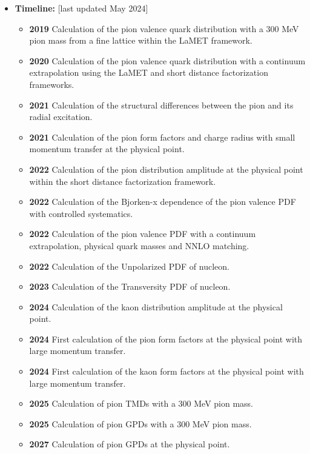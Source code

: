 \documentclass[12pt,hyperpdf]{article}
\begin{document}
\begin{itemize}
\item{\bf Timeline:} \hfill [last updated May 2024]
\begin{itemize}
    \item{\bf 2019} Calculation of the pion valence quark distribution with a 300 MeV pion mass from a fine lattice within the LaMET framework.~\cite{Izubuchi:2019lyk}
    \item{\bf 2020} Calculation of the pion valence quark distribution with a continuum extrapolation using the LaMET and short distance factorization frameworks.~\cite{Gao:2020ito}
    \item{\bf 2021} Calculation of the structural differences between the pion and its radial excitation.~\cite{Gao:2021hvs}
    \item{\bf 2021} Calculation of the pion form factors and charge radius with small momentum transfer at the physical point.~\cite{Gao:2021xsm}
    \item{\bf 2022} Calculation of the pion distribution amplitude at the physical point within the short distance factorization framework.~\cite{Gao:2022vyh}
    \item{\bf 2022} Calculation of the Bjorken-x dependence of the pion valence PDF with controlled systematics.~\cite{Gao:2021dbh}
    \item{\bf 2022} Calculation of the pion valence PDF with a continuum extrapolation, physical quark masses and NNLO matching.~\cite{Gao:2022iex}
    \item{\bf 2022} Calculation of the Unpolarized PDF of nucleon.~\cite{Gao:2022uhg}
    \item{\bf 2023} Calculation of the Transversity PDF of nucleon.~\cite{Gao:2023ktu}
    \item{\bf 2024} Calculation of the kaon distribution amplitude at the physical point.
    \item{\bf 2024} First calculation of the pion form factors at the physical point with large momentum transfer.
    \item{\bf 2024} First calculation of the kaon form factors at the physical point with large momentum transfer.
    \item{\bf 2025} Calculation of pion TMDs with a 300 MeV pion mass.
    \item{\bf 2025} Calculation of pion GPDs with a 300 MeV pion mass.
    \item{\bf 2027} Calculation of pion GPDs at the physical point.
\end{itemize}
\end{itemize}
\end{document}
